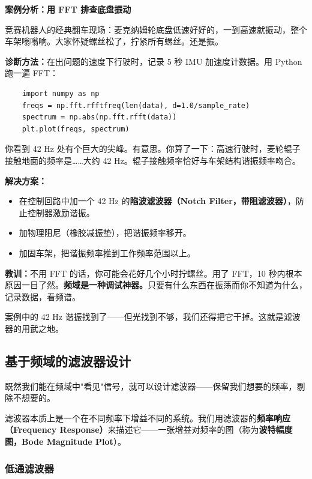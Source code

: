 \vspace{0.5em}
\begin{mdframed}[linewidth=1pt, innertopmargin=10pt, innerbottommargin=10pt]
\textbf{案例分析：用 FFT 排查底盘振动}

\vspace{0.3em}
竞赛机器人的经典翻车现场：麦克纳姆轮底盘低速好好的，一到高速就振动，整个车架嗡嗡响。大家怀疑螺丝松了，拧紧所有螺丝。还是振。

\textbf{诊断方法：}在出问题的速度下行驶时，记录 5 秒 IMU 加速度计数据。用 Python 跑一遍 FFT：

\begin{verbatim}
    import numpy as np
    freqs = np.fft.rfftfreq(len(data), d=1.0/sample_rate)
    spectrum = np.abs(np.fft.rfft(data))
    plt.plot(freqs, spectrum)
\end{verbatim}

你看到 42 Hz 处有个巨大的尖峰。有意思。你算了一下：高速行驶时，麦轮辊子接触地面的频率是……大约 42 Hz。辊子接触频率恰好与车架结构谐振频率吻合。

\textbf{解决方案：}
\begin{itemize}[nosep]
    \item 在控制回路中加一个 42 Hz 的\textbf{陷波滤波器（Notch Filter，带阻滤波器）}，防止控制器激励谐振。
    \item 加物理阻尼（橡胶减振垫），把谐振频率移开。
    \item 加固车架，把谐振频率推到工作频率范围以上。
\end{itemize}

\textbf{教训：}不用 FFT 的话，你可能会花好几个小时拧螺丝。用了 FFT，10 秒内根本原因一目了然。\textbf{频域是一种调试神器。}只要有什么东西在振荡而你不知道为什么，记录数据，看频谱。
\end{mdframed}

案例中的 42 Hz 谐振找到了——但光找到不够，我们还得把它干掉。这就是滤波器的用武之地。

\subsection{基于频域的滤波器设计}

既然我们能在频域中"看见"信号，就可以设计滤波器——保留我们想要的频率，剔除不想要的。

滤波器本质上是一个在不同频率下增益不同的系统。我们用滤波器的\textbf{频率响应（Frequency Response）}来描述它——一张增益对频率的图（称为\textbf{波特幅度图，Bode Magnitude Plot}）。

\subsubsection{低通滤波器}

